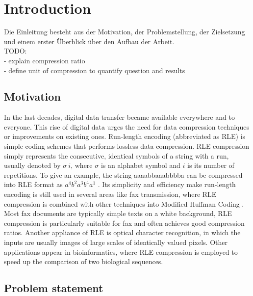 
\chapter{Introduction}
\label{ch:Introduction}
Die Einleitung besteht aus der Motivation, der Problemstellung, der Zielsetzung und einem erster Überblick über den Aufbau der Arbeit. \\
TODO: \\
- explain compression ratio \\
- define unit of compression to quantify question and results \\

\section{Motivation}
\label{ch:Introduction:sec:Motivation}

In the last decades, digital data transfer became available everywhere and to everyone. This rise of digital data urges the need for data compression techniques or improvements on existing ones. Run-length encoding \cite{rle-patent} (abbreviated as RLE) is simple coding schemes that performs lossless data compression. RLE compression simply represents the consecutive, identical symbols of
a string with a run, usually denoted by $\sigma \ i$, where $\sigma$ is an alphabet symbol and $i$ is its number of repetitions. To give an example, the string aaaabbaaabbbba can be compressed into RLE format as  $ a^{4}b^{2}a^{3}b^{4}a^{1}$ . Its simplicity and efficiency make run-length encoding is still used in several areas like fax transmission, where RLE compression is combined with other techniques into Modified Huffman Coding \cite{fax-rle}. Most fax documents are typically simple texts on a white background, RLE compression is particularly suitable for fax and often achieves good compression ratios. Another appliance of RLE is optical character recognition, in which the inputs are usually images of large scales of identically valued pixels. Other applications appear in bioinformatics, where RLE compression is employed to speed up the comparison of two biological sequences.

\section{Problem statement}
\label{ch:Introduction:sec:Problem statement}

